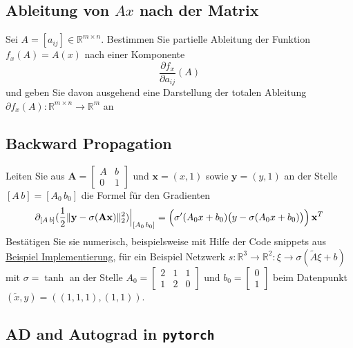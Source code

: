 \documentclass[
]{book}
\theoremstyle{definition}
\theoremstyle{definition}
\theoremstyle{definition}
\theoremstyle{definition}
\theoremstyle{remark}
\begin{document}
\hypertarget{ableitung-von-ax-nach-der-matrix}{%
\subsection{\texorpdfstring{Ableitung von \(Ax\) nach der Matrix}{Ableitung von Ax nach der Matrix}}\label{ableitung-von-ax-nach-der-matrix}}

Sei \(A=[a_{ij}]\in \mathbb R^{m\times n}\). Bestimmen Sie partielle Ableitung der
Funktion \(f_x(A)=A(x)\) nach einer Komponente
\begin{equation*}
\frac{\partial {f_x}}{{\partial a_{ij}}}(A)
\end{equation*}
und geben Sie davon ausgehend eine Darstellung der totalen Ableitung \(\partial f_x(A) \colon \mathbb R^{m\times n}\to \mathbb R^{m}\) an

\hypertarget{backward-propagation}{%
\subsection{Backward Propagation}\label{backward-propagation}}

Leiten Sie aus \(\mathbf A = \begin{bmatrix} A & b \\ 0 & 1 \end{bmatrix}\) und
\(\mathbf x = (x, 1)\) sowie \(\mathbf y = (y, 1)\)
an der Stelle \([A\,b]=[A_0\, b_0]\) die Formel für den Gradienten
\begin{equation*}
\partial_{[A\,b]} (\frac 12 \|\mathbf y-\sigma(\mathbf A\mathbf x)\|_2^2)\Bigr|_{[A_0\, b_0]}=\Bigl (\sigma'(A_0x+b_0)\bigr (y-\sigma(A_0x+b_0)\bigr )\Bigr)\,\mathbf x^T
\end{equation*}
Bestätigen Sie sie numerisch, beispielsweise mit Hilfe der Code snippets aus
\protect\hyperlink{beispiel-implementierung}{Beispiel Implementierung},
für ein Beispiel Netzwerk \(s\colon \mathbb R^{3}\to \mathbb R^{2}\colon \xi \to \sigma(\tilde A\xi + b)\)
mit \(\sigma = \tanh\) an der Stelle
\(A_0=\begin{bmatrix}2 & 1 & 1 \\ 1 & 2& 0 \end{bmatrix}\) und
\(b_0=\begin{bmatrix}0\\1 \end{bmatrix}\) beim Datenpunkt \((\tilde x, y) = ((1,1,1), (1, 1))\).

\hypertarget{ad-and-autograd-in-pytorch}{%
\subsection{\texorpdfstring{AD and Autograd in \texttt{pytorch}}{AD and Autograd in pytorch}}\label{ad-and-autograd-in-pytorch}}
\end{document}

